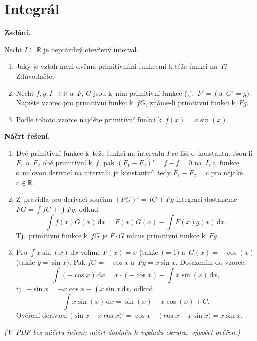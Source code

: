 \section{Integrál}

\noindent\textbf{Zadání.}\par
Nechť $I \subseteq \mathbb{R}$ je neprázdný otevřený interval.
\begin{enumerate}
  \item Jaký je vztah mezi dvěma primitivními funkcemi k téže funkci na~$I$? Zdůvodněte.
  \item Nechť $f, g \colon I \to \mathbb{R}$ a~$F$, $G$ jsou k~nim primitivní funkce (tj.\ $F' = f$ a~$G' = g$). Napište vzorec pro primitivní funkci k~$fG$, známe-li primitivní funkci k~$Fg$.
  \item Podle tohoto vzorce najděte primitivní funkci k~$f(x) = x \sin(x)$.
\end{enumerate}

\medskip
\noindent\textbf{Náčrt řešení.}\par
\begin{enumerate}
  \item Dvě primitivní funkce k~téže funkci na intervalu $I$ se liší o~konstantu. Jsou-li $F_1$ a~$F_2$ obě primitivní k~$f$, pak $(F_1 - F_2)' = f - f = 0$ na~$I$, a~funkce s~nulovou derivací na intervalu je konstantní; tedy $F_1 - F_2 = c$ pro nějaké $c \in \mathbb{R}$.
  \item Z~pravidla pro derivaci součinu $(FG)' = f G + F g$ integrací dostaneme $FG = \int fG + \int Fg$, odkud
    \[
      \int f(x) G(x)\,\mathrm{d}x = F(x) G(x) - \int F(x) g(x)\,\mathrm{d}x.
    \]
    Tj.\ primitivní funkce k~$fG$ je $F \cdot G$ mínus primitivní funkce k~$Fg$.
  \item Pro $\int x \sin(x)\,\mathrm{d}x$ volíme $F(x) = x$ (takže $f = 1$) a~$G(x) = -\cos(x)$ (takže $g = \sin x$). Pak $fG = -\cos x$ a~$Fg = x \sin x$. Dosazením do vzorce:
    \[
      \int (-\cos x)\,\mathrm{d}x = x \cdot (-\cos x) - \int x \sin(x)\,\mathrm{d}x,
    \]
    tj.\ $-\sin x = -x\cos x - \int x \sin x\,\mathrm{d}x$, odkud
    \[
      \int x \sin(x)\,\mathrm{d}x = \sin(x) - x\cos(x) + C.
    \]
    Ověření derivací: $\bigl(\sin x - x\cos x\bigr)' = \cos x - \bigl(\cos x - x\sin x\bigr) = x\sin x$.
\end{enumerate}

\medskip
\noindent\textit{(V~PDF bez náčrtu řešení; náčrt doplněn k~výkladu okruhu, výpočet ověřen.)}
